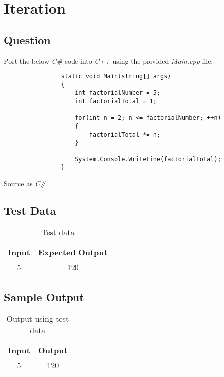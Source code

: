 \section{Iteration}
    \subsection*{Question}
    Port the below \textit{C\#} code into \textit{C++} using the provided \textit{Main.cpp} file:
        \begin{listing}[H]
            \begin{verbatim}
                static void Main(string[] args)
                {
                    int factorialNumber = 5;
                    int factorialTotal = 1;

                    for(int n = 2; n <= factorialNumber; ++n)
                    {
                        factorialTotal *= n;
                    }

                    System.Console.WriteLine(factorialTotal);
                }
            \end{verbatim}
            \caption{Source as \textit{C\#}}
        \end{listing}

    \subsection*{Test Data}
        \begin{table}[H]
            \centering
            \begin{tabular}{c c}
                \hline
                \textbf{Input} & \textbf{Expected Output} \\
                \hline
                5 & 120 \\
                \hline
            \end{tabular}
            \caption{Test data}
        \end{table}
        
    \subsection*{Sample Output}
        \begin{table}[H]
            \centering
            \begin{tabular}{c c}
                \hline
                \textbf{Input} & \textbf{Output} \\
                \hline
                5 & 120 \\
                \hline
            \end{tabular}
            \caption{Output using test data}
        \end{table}

